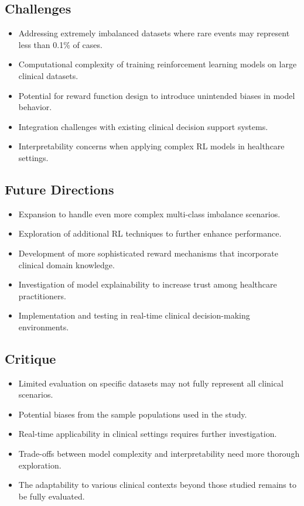 \subsection*{Challenges}
\begin{itemize}
    \item Addressing extremely imbalanced datasets where rare events may represent less than 0.1\% of cases.
    \item Computational complexity of training reinforcement learning models on large clinical datasets.
    \item Potential for reward function design to introduce unintended biases in model behavior.
    \item Integration challenges with existing clinical decision support systems.
    \item Interpretability concerns when applying complex RL models in healthcare settings.
\end{itemize}

\subsection*{Future Directions}
\begin{itemize}
    \item Expansion to handle even more complex multi-class imbalance scenarios.
    \item Exploration of additional RL techniques to further enhance performance.
    \item Development of more sophisticated reward mechanisms that incorporate clinical domain knowledge.
    \item Investigation of model explainability to increase trust among healthcare practitioners.
    \item Implementation and testing in real-time clinical decision-making environments.
\end{itemize}

\subsection*{Critique}
\begin{itemize}
    \item Limited evaluation on specific datasets may not fully represent all clinical scenarios.
    \item Potential biases from the sample populations used in the study.
    \item Real-time applicability in clinical settings requires further investigation.
    \item Trade-offs between model complexity and interpretability need more thorough exploration.
    \item The adaptability to various clinical contexts beyond those studied remains to be fully evaluated.
\end{itemize}
